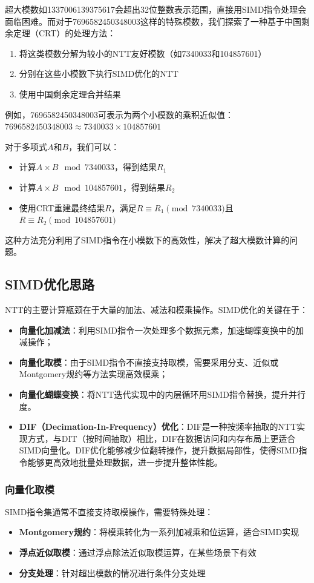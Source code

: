\documentclass[a4paper,colorlinks=true,linkcolor=blue,urlcolor=blue,citecolor=green,bookmarks=true]{article}
\begin{document}
超大模数如1337006139375617会超出32位整数表示范围，直接用SIMD指令处理会面临困难。而对于7696582450348003这样的特殊模数，我们探索了一种基于中国剩余定理（CRT）的处理方法：

\begin{enumerate}
  \item 将这类模数分解为较小的NTT友好模数（如7340033和104857601）
  \item 分别在这些小模数下执行SIMD优化的NTT
  \item 使用中国剩余定理合并结果
\end{enumerate}

例如，7696582450348003可表示为两个小模数的乘积近似值：
$7696582450348003 \approx 7340033 \times 104857601$

对于多项式$A$和$B$，我们可以：
\begin{itemize}
  \item 计算$A \times B \mod 7340033$，得到结果$R_1$
  \item 计算$A \times B \mod 104857601$，得到结果$R_2$
  \item 使用CRT重建最终结果$R$，满足$R \equiv R_1 \pmod{7340033}$且$R \equiv R_2 \pmod{104857601}$
\end{itemize}

这种方法充分利用了SIMD指令在小模数下的高效性，解决了超大模数计算的问题。

\subsection{SIMD优化思路}
NTT的主要计算瓶颈在于大量的加法、减法和模乘操作。SIMD优化的关键在于：
\begin{itemize}
  \item \textbf{向量化加减法}：利用SIMD指令一次处理多个数据元素，加速蝴蝶变换中的加减操作\cite{intel-avx2}；
  \item \textbf{向量化取模}：由于SIMD指令不直接支持取模，需要采用分支、近似或Montgomery规约等方法实现高效模乘；
  \item \textbf{向量化蝴蝶变换}：将NTT迭代实现中的内层循环用SIMD指令替换，提升并行度\cite{zhang2022}。
  \item \textbf{DIF（Decimation-In-Frequency）优化}：DIF是一种按频率抽取的NTT实现方式，与DIT（按时间抽取）相比，DIF在数据访问和内存布局上更适合SIMD向量化\cite{wu2023}。DIF优化能够减少位翻转操作，提升数据局部性，使得SIMD指令能够更高效地批量处理数据，进一步提升整体性能。
\end{itemize}

\subsubsection{向量化取模}
SIMD指令集通常不直接支持取模操作，需要特殊处理：
\begin{itemize}
  \item \textbf{Montgomery规约}：将模乘转化为一系列加减乘和位运算，适合SIMD实现
  \item \textbf{浮点近似取模}：通过浮点除法近似取模运算，在某些场景下有效
  \item \textbf{分支处理}：针对超出模数的情况进行条件分支处理
\end{itemize}
\end{document}
